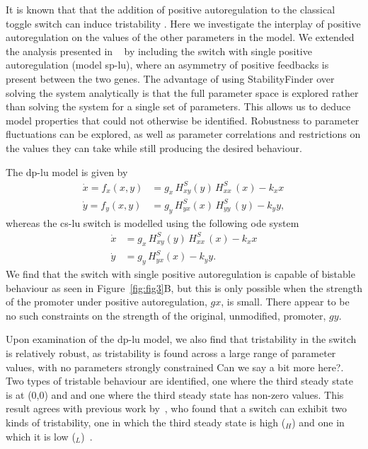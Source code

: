 It is known that that the addition of positive autoregulation to the classical toggle switch can induce tristability  \autocite{XXX, Lu:2014kc}. Here we investigate the interplay of positive autoregulation on the values of the other parameters in the model. We extended the analysis presented in ~\textcite{Lu:2014kc} by including the switch with single positive autoregulation (model \acrshort{sp-lu}), where an asymmetry of positive feedbacks is present between the two genes. The advantage of using StabilityFinder over solving the system analytically is that the full parameter space is explored rather than solving the system for a single set of parameters. This allows us to deduce model properties that could not otherwise be identified. Robustness to parameter fluctuations can be explored, as well as parameter correlations and restrictions on the values they can take while still producing the desired behaviour.  
\par
The \acrshort{dp-lu} model is given by
\begin{align*}
\dot{x} = f_{x}(x,y) &= g_{x}\, H^{S}_{xy}(y)\, H^{S}_{xx}\,(x)-k_{x}x \\
\dot{y} = f_{y}(x,y) &= g_{y}\,H^{S}_{yx}(x)\,H^{S}_{yy}\,(y)-k_{y}y,
\end{align*}
whereas the \acrshort{cs-lu} switch is modelled using the following \acrshort{ode} system
\begin{align*}
\dot{x} & = g_{x}\, H^{S}_{xy}(y)\, H^{S}_{xx}\,(x)-k_{x}x \\
\dot{y} & = g_{y}\,H^{S}_{yx}(x) - k_{y}y.
\end{align*}
We find that the switch with single positive autoregulation is capable of bistable behaviour as seen in Figure~\ref{fig:fig3}B, but this is only possible when the strength of the promoter under positive autoregulation, $gx$, is small. There appear to be no such constraints on the strength of the original, unmodified, promoter, $gy$.  
\par
Upon examination of the \acrshort{dp-lu} model, we also find that tristability in the switch is relatively robust, as tristability is found across a large range of parameter values, with no parameters strongly constrained {\color{red} Can we say a bit more here?}. Two types of tristable behaviour are identified, one where the third steady state is at (0,0) and and one where the third steady state has non-zero values. This result agrees with previous work by~\textcite{Guantes:2008gs}, who found that a switch can exhibit two kinds of tristability, one in which the third steady state is high ($_H$) and one in which it is low ($_L$)~\autocite{Guantes:2008gs}. %

